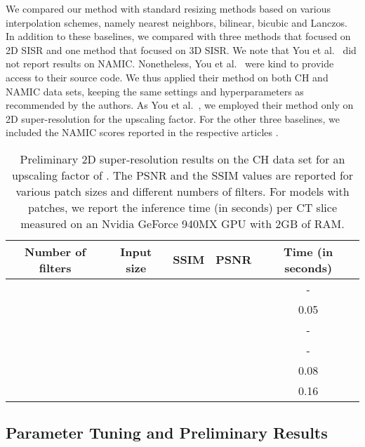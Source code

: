 \documentclass{ieeeaccess}
\begin{document}
We compared our method with standard resizing methods based on various interpolation schemes, namely nearest neighbors, bilinear, bicubic and Lanczos. In addition to these baselines, we compared with three methods \cite{Du-AS-2019, You-TMI-2019, ZENG-CBM-2018} that focused on 2D SISR and one method \cite{Pham-CMIG-2019} that focused on 3D SISR. We note that You et al.~\cite{You-TMI-2019} did not report results on NAMIC. Nonetheless, You et al.~\cite{You-TMI-2019} were kind to provide access to their source code. We thus applied their method on both CH and NAMIC data sets, keeping the same settings and hyperparameters as recommended by the authors. As You et al.~\cite{You-TMI-2019}, we employed their method only on 2D super-resolution for the  upscaling factor. For the other three baselines, we included the NAMIC scores reported in the respective articles \cite{Du-AS-2019, Pham-CMIG-2019, ZENG-CBM-2018}.

\begin{table}[!t]
\caption{Preliminary 2D super-resolution results on the CH data set for an upscaling factor of . The PSNR and the SSIM values are reported for various patch sizes and different numbers of filters. For models with  patches, we report the inference time (in seconds) per CT slice measured on an Nvidia GeForce 940MX GPU with 2GB of RAM.}\label{tab_preliminary_results}
\begin{center}
\setlength\tabcolsep{3.0pt}
\begin{tabular}{|c|c|c|c|c|}
\hline  
Number of filters& Input size     & SSIM           & PSNR       & Time (in seconds)      \\ 
\hline
\hline   
             &    &        &     &         -              \\  
             &    &        &     &        0.05             \\   
             &  &        &     &         -              \\  
             &  &        &     &         -              \\  
\hline   
             &    &        &     &        0.08            \\ 
            &    &        &     &        0.16            \\  
\hline   
\end{tabular}
\end{center}
\end{table}

\subsection{Parameter Tuning and Preliminary Results} 
\end{document}
